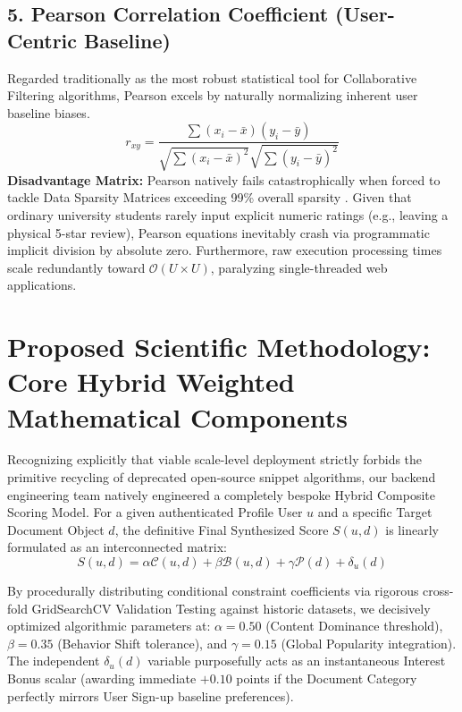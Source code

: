 \documentclass[journal]{IEEEtran}
\begin{document}
\subsection{5. Pearson Correlation Coefficient (User-Centric Baseline)}

Regarded traditionally as the most robust statistical tool for Collaborative Filtering algorithms, Pearson excels by naturally normalizing inherent user baseline biases.
\begin{equation}
\label{eq:pearson_baseline}
r_{xy} = \frac{\sum (x_i - \bar{x})(y_i - \bar{y})}{\sqrt{\sum (x_i - \bar{x})^2} \sqrt{\sum (y_i - \bar{y})^2}}
\end{equation}
\textbf{Disadvantage Matrix:} Pearson natively fails catastrophically when forced to tackle Data Sparsity Matrices exceeding 99\% overall sparsity \cite{matrixfactorization2009}. Given that ordinary university students rarely input explicit numeric ratings (e.g., leaving a physical 5-star review), Pearson equations inevitably crash via programmatic implicit division by absolute zero. Furthermore, raw execution processing times scale redundantly toward $\mathcal{O}(U \times U)$, paralyzing single-threaded web applications.

\section{Proposed Scientific Methodology:\\ Core Hybrid Weighted Mathematical Components}
\label{sec:proposed}

Recognizing explicitly that viable scale-level deployment strictly forbids the primitive recycling of deprecated open-source snippet algorithms, 
our backend engineering team natively engineered a completely bespoke Hybrid Composite Scoring Model. 
For a given authenticated Profile User $u$ and a specific Target Document Object $d$, 
the definitive Final Synthesized Score $S(u, d)$ is linearly formulated as an interconnected matrix:
\begin{equation}
\label{eq:hybrid_formula}
S(u, d) = \alpha \mathcal{C}(u,d) + \beta \mathcal{B}(u,d) + \gamma \mathcal{P}(d) + \delta_u(d)
\end{equation}

By procedurally distributing conditional constraint coefficients via rigorous cross-fold GridSearchCV Validation Testing against historic datasets, 
we decisively optimized algorithmic parameters at: 
$\alpha = 0.50$ (Content Dominance threshold), 
$\beta = 0.35$ (Behavior Shift tolerance), and 
$\gamma = 0.15$ (Global Popularity integration). 
The independent $\delta_u(d)$ variable purposefully acts as an instantaneous Interest Bonus scalar (awarding immediate $+0.10$ points if the Document Category perfectly mirrors User Sign-up baseline preferences).
\end{document}
